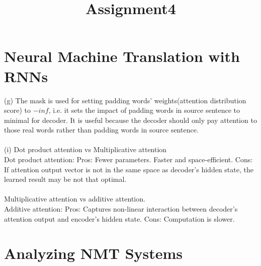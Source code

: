 \documentclass[11pt]{article}
\title{Assignment4}
\begin{document}
\maketitle
\section{Neural Machine Translation with RNNs}
(g) The mask is used for setting padding words' weights(attention distribution score) to $-inf$, i.e. it sets the impact of padding words in source sentence to minimal for decoder. It is useful because the decoder should only pay attention to those real words rather than padding words in source sentence.\\\\
(i) Dot product attention vs Multiplicative attention \\
Dot product attention: Pros: Fewer parameters. Faster and space-efficient. Cons: If attention output vector is not in the same space as decoder's hidden state, the learned result may be not that optimal.\\\\
Multiplicative attention vs additive attention.\\
Additive attention: Pros: Captures non-linear interaction between decoder's attention output and encoder's hidden state. Cons: Computation is slower.
\section{Analyzing NMT Systems}
\end{document}
